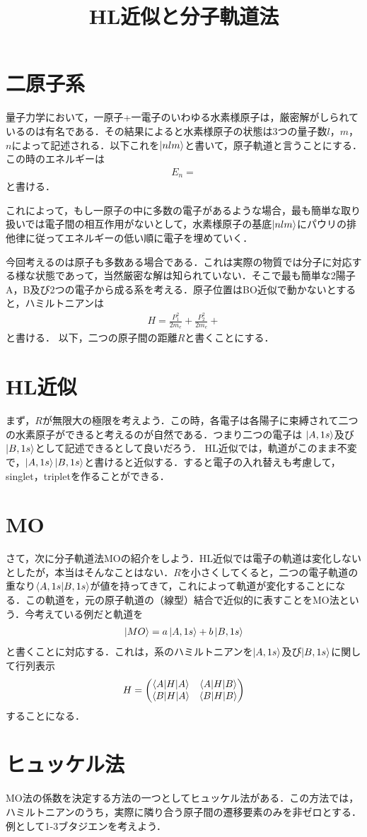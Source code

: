 \documentclass[a4j]{jarticle}
\title{HL近似と分子軌道法}
\begin{document}
\section{二原子系}
量子力学において，一原子+一電子のいわゆる水素様原子は，厳密解がしられているのは有名である．その結果によると水素様原子の状態は$3$つの量子数$l$，$m$，$n$によって記述される．以下これを$\ket{nlm}$と書いて，原子軌道と言うことにする．この時のエネルギーは
\begin{align*}
 E_n=
\end{align*}
と書ける．

これによって，もし一原子の中に多数の電子があるような場合，最も簡単な取り扱いでは電子間の相互作用がないとして，水素様原子の基底$\ket{nlm}$にパウリの排他律に従ってエネルギーの低い順に電子を埋めていく．

今回考えるのは原子も多数ある場合である．これは実際の物質では分子に対応する様な状態であって，当然厳密な解は知られていない．そこで最も簡単な2陽子A，B及び2つの電子から成る系を考える．原子位置はBO近似で動かないとすると，ハミルトニアンは
\begin{align*}
 H=\frac{P_1^2}{2m_e}+\frac{P_2^2}{2m_e}+
\end{align*}
と書ける．
以下，二つの原子間の距離$R$と書くことにする．

\section{HL近似}
まず，$R$が無限大の極限を考えよう．この時，各電子は各陽子に束縛されて二つの水素原子ができると考えるのが自然である．つまり二つの電子は
$\ket{A,1s}$及び$\ket{B,1s}$として記述できるとして良いだろう．
HL近似では，軌道がこのまま不変で，$\ket{A,1s}\ket{B,1s}$と書けると近似する．すると電子の入れ替えも考慮して，singlet，tripletを作ることができる．








\section{MO}
さて，次に分子軌道法MOの紹介をしよう．HL近似では電子の軌道は変化しないとしたが，本当はそんなことはない．$R$を小さくしてくると，二つの電子軌道の重なり$\braket{A,1s|B,1s}$が値を持ってきて，これによって軌道が変化することになる．この軌道を，元の原子軌道の（線型）結合で近似的に表すことをMO法という．今考えている例だと軌道を
\begin{align*}
 \ket{MO}=a\ket{A,1s}+b\ket{B,1s}
\end{align*}
と書くことに対応する．これは，系のハミルトニアンを$\ket{A,1s}$及び$\ket{B,1s}$に関して行列表示
\begin{align*}
 H=
 \begin{pmatrix}
  \braket{A|H|A} & \braket{A|H|B} \\
 \braket{B|H|A} & \braket{B|H|B} \\
 \end{pmatrix}
\end{align*}
することになる．

\section{ヒュッケル法}
MO法の係数を決定する方法の一つとしてヒュッケル法がある．この方法では，ハミルトニアンのうち，実際に隣り合う原子間の遷移要素のみを非ゼロとする．例として1-3ブタジエンを考えよう．
\end{document}

